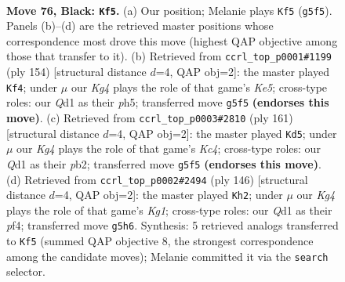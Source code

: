 \documentclass[11pt]{article}
\begin{document}
\clearpage

\begin{figure}[p]\centering
\begin{subfigure}{0.46\textwidth}\centering
\resizebox{\linewidth}{!}{%
\newchessgame
\chessboard[
  setfen={8/8/1p6/p5k1/2P5/8/1K6/3q4 b - - 9 76},
  showmover=false,
  pgfstyle=straightmove, color=movearrow, markmove={g5-f5}
]}
\caption{}
\end{subfigure}\hfill
\begin{subfigure}{0.46\textwidth}\centering
\resizebox{\linewidth}{!}{%
\newchessgame
\chessboard[
  setfen={5k2/8/8/p3K2p/2P5/1P6/8/8 w - - 3 78},
  showmover=false,
  pgfstyle=straightmove, color=movearrow, markmove={e5-f4}
]}
\caption{}
\end{subfigure}
\\[4pt]
\begin{subfigure}{0.46\textwidth}\centering
\resizebox{\linewidth}{!}{%
\newchessgame
\chessboard[
  setfen={8/6p1/6Pp/2k5/8/8/1P6/6K1 b - - 14 81},
  showmover=false,
  pgfstyle=straightmove, color=movearrow, markmove={c5-d5}
]}
\caption{}
\end{subfigure}\hfill
\begin{subfigure}{0.46\textwidth}\centering
\resizebox{\linewidth}{!}{%
\newchessgame
\chessboard[
  setfen={8/8/8/3k2Pp/5p1P/8/8/6K1 w - - 12 74},
  showmover=false,
  pgfstyle=straightmove, color=movearrow, markmove={g1-h2}
]}
\caption{}
\end{subfigure}
\caption{\textbf{Move 76, Black: \texttt{Kf5}.} (a) Our position; Melanie plays \texttt{Kf5} (\texttt{g5f5}). Panels (b)--(d) are the retrieved master positions whose correspondence most drove this move (highest QAP objective among those that transfer to it). (b) Retrieved from \texttt{ccrl\_top\_p0001\#1199} (ply 154) [structural distance $d$=4, QAP obj=2]: the master played \texttt{Kf4}; under $\mu$ our \emph{Kg4} plays the role of that game's \emph{Ke5}; cross-type roles: our \emph{Q}d1 as their \emph{p}h5; transferred move \texttt{g5f5} \textbf{(endorses this move)}. (c) Retrieved from \texttt{ccrl\_top\_p0003\#2810} (ply 161) [structural distance $d$=4, QAP obj=2]: the master played \texttt{Kd5}; under $\mu$ our \emph{Kg4} plays the role of that game's \emph{Kc4}; cross-type roles: our \emph{Q}d1 as their \emph{p}b2; transferred move \texttt{g5f5} \textbf{(endorses this move)}. (d) Retrieved from \texttt{ccrl\_top\_p0002\#2494} (ply 146) [structural distance $d$=4, QAP obj=2]: the master played \texttt{Kh2}; under $\mu$ our \emph{Kg4} plays the role of that game's \emph{Kg1}; cross-type roles: our \emph{Q}d1 as their \emph{p}f4; transferred move \texttt{g5h6}. Synthesis: 5 retrieved analogs transferred to \texttt{Kf5} (summed QAP objective 8, the strongest correspondence among the candidate moves); Melanie committed it via the \texttt{search} selector.}
\label{fig:thought-m151}
\end{figure}
\end{document}
